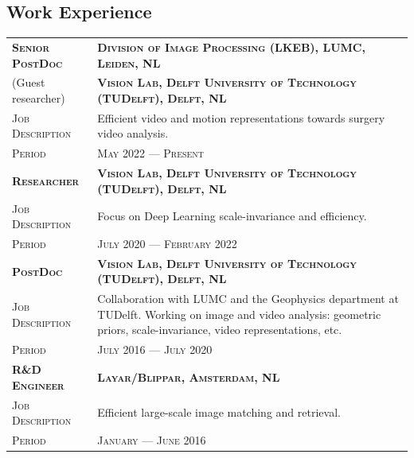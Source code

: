 \documentclass[a4paper, oneside, final]{scrartcl}
\newcommand{\gray}{\rowcolor[gray]{.90}}
\begin{document}
\begin{center}
		\section{Work Experience}
        \begin{tabular}{p{3.5cm}@{\hskip 0.3in}p{12.3cm}}
			\gray \textsc{\textbf{Senior PostDoc}} & \textsc{\textbf{Division of Image Processing (LKEB), LUMC, Leiden, NL}}\\
            \gray (Guest researcher)               & \textsc{\textbf{Vision Lab, Delft University of Technology (TUDelft), Delft, NL}}\\
			\textsc{Job Description}               & Efficient video and motion representations towards surgery video analysis.\\ 
			\textsc{Period}                        & \textsc{May 2022 --- Present} 
            \vspace{5px}\\
			\gray \textsc{\textbf{Researcher}} & \textsc{\textbf{Vision Lab, Delft University of Technology (TUDelft), Delft, NL}}\\
			\textsc{Job Description}            & Focus on Deep Learning scale-invariance and efficiency.\\
			\textsc{Period}                     & \textsc{July 2020 --- February 2022} 
            \vspace{5px}\\
			\gray \textsc{\textbf{PostDoc}}     & \textsc{\textbf{Vision Lab, Delft University of Technology (TUDelft), Delft, NL}}\\
			\textsc{Job Description}            & Collaboration with LUMC and the Geophysics department at TUDelft.
                                                Working on image and video analysis: geometric priors, scale-invariance, video representations, etc.\\
			\textsc{Period}                     & \textsc{July 2016 --- July 2020} 
            \vspace{5px}\\
			\gray \textsc{\textbf{R\&D Engineer}}   & \textsc{\textbf{Layar\slash Blippar, Amsterdam, NL}}\\
			\textsc{Job Description}                & Efficient large-scale image matching and retrieval.\\
			\textsc{Period}                         & \textsc{January --- June 2016} 
		\end{tabular}



\end{center}
\end{document}
